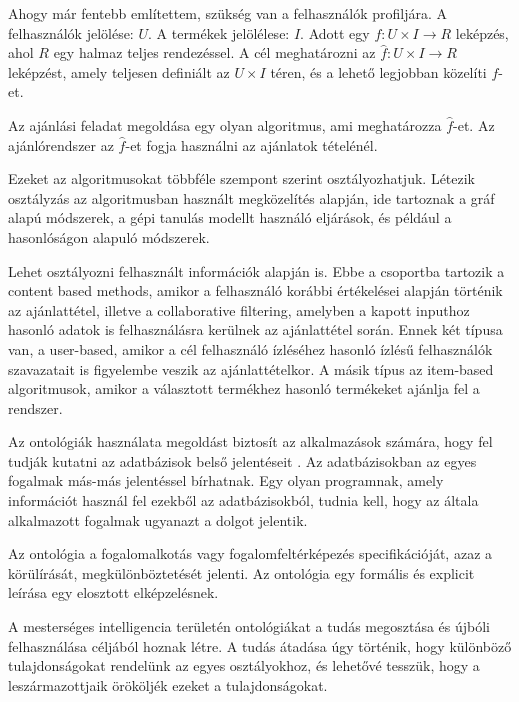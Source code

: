 
Ahogy már fentebb említettem, szükség van a felhasználók profiljára. A felhasználók jelölése: $U$. A termékek jelölélese: $I$. Adott egy $f: U \times I \rightarrow R$ leképzés, ahol $R$ egy halmaz teljes rendezéssel. A cél meghatározni az $\hat{f}: U \times I \rightarrow R$ leképzést, amely teljesen definiált az $U \times I$ téren, és a lehető legjobban közelíti $f$-et.


Az ajánlási feladat megoldása egy olyan algoritmus, ami meghatározza $\hat{f}$-et. Az ajánlórendszer az $\hat{f}$-et fogja használni az ajánlatok tételénél.


Ezeket az algoritmusokat többféle szempont szerint osztályozhatjuk. Létezik osztályzás az algoritmusban használt megközelítés alapján, ide tartoznak a gráf alapú módszerek, a gépi tanulás modellt használó eljárások, és például a hasonlóságon alapuló módszerek.

Lehet osztályozni felhasznált információk alapján is. Ebbe a csoportba tartozik a content based methods, amikor a felhasználó korábbi értékelései alapján történik az ajánlattétel, illetve a collaborative filtering, amelyben a kapott inputhoz hasonló adatok is felhasználásra kerülnek az ajánlattétel során. Ennek két típusa van, a user-based, amikor a cél felhasználó ízléséhez hasonló ízlésű felhasználók szavazatait is figyelembe veszik az ajánlattételkor. A másik típus az item-based algoritmusok, amikor a választott termékhez hasonló termékeket ajánlja fel a rendszer.

\newpage


Az ontológiák használata megoldást biztosít az alkalmazások számára, hogy fel tudják kutatni az adatbázisok belső jelentéseit \cite{owl}. Az adatbázisokban az egyes fogalmak más-más jelentéssel bírhatnak. Egy olyan programnak, amely információt használ fel ezekből az adatbázisokból, tudnia kell, hogy az általa alkalmazott fogalmak ugyanazt a dolgot jelentik.

Az ontológia a fogalomalkotás vagy fogalomfeltérképezés specifikációját, azaz a körülírását, megkülönböztetését jelenti. Az ontológia egy formális és explicit leírása egy elosztott elképzelésnek. 

A mesterséges intelligencia területén ontológiákat a tudás megosztása és újbóli felhasználása céljából hoznak létre. A tudás átadása úgy történik, hogy különböző tulajdonságokat rendelünk az egyes osztályokhoz, és lehetővé tesszük, hogy a leszármazottjaik örököljék ezeket a tulajdonságokat.

